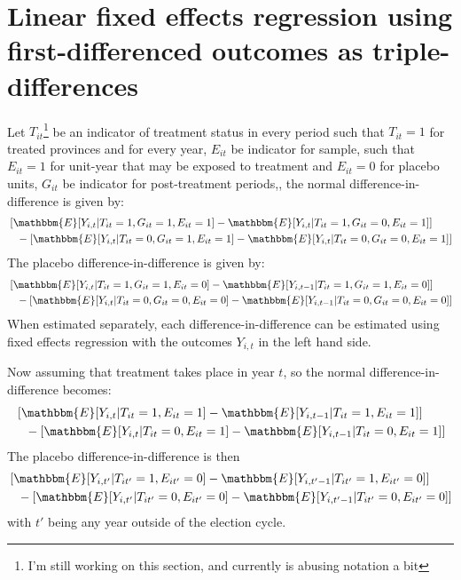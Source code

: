 \documentclass[12pt]{article}\usepackage[]{graphicx}\usepackage[]{color}
\newcommand{\1}{\mathbbm{1}}
\renewcommand\r{\right}
\renewcommand\l{\left}
\newcommand\E{\mathbbm{E}}
\begin{document}
\section{Linear fixed effects regression using first-differenced outcomes as triple-differences}
\label{app:proof1}

Let $T_{it}$\footnote{I'm still working on this section, and currently is abusing notation a bit} be an indicator of treatment status in every period such that $T_{it} = 1$ for treated provinces and for every year, $E_{it}$ be indicator for sample, such that $E_{it} = 1 $ for unit-year that may be exposed to treatment and $E_{it} = 0$ for placebo units, $G_{it}$ be indicator for post-treatment periods,, the normal difference-in-difference is given by:
	\begin{align*}
		& \l[\E[Y_{i,t} | T_{it}=1, G_{it}=1, E_{it}=1] - \E[Y_{i,t} | T_{it}=1, G_{it}=0, E_{it}=1]\r] \\
		&\phantom{=} - \l[\E[Y_{i,t} | T_{it}=0, G_{it}=1, E_{it}=1] - \E[Y_{i,t} | T_{it}=0, G_{it}=0, E_{it}=1]\r]
	\end{align*}
The placebo difference-in-difference is given by:
	\begin{align*}
		&\l[\E[Y_{i,t} | T_{it}=1, G_{it}=1, E_{it}=0] - \E[Y_{i,t-1} | T_{it}=1, G_{it}=1, E_{it}=0]\r] \\
		&\phantom{=} - \l[\E[Y_{i,t} | T_{it}=0, G_{it}=0, E_{it}=0] - \E[Y_{i,t-1} | T_{it}=0, G_{it}=0, E_{it}=0]\r]
	\end{align*}
When estimated separately, each difference-in-difference can be estimated using fixed effects regression with the outcomes $Y_{i,t}$ in the left hand side.

Now assuming that treatment takes place in year $t$, so the normal difference-in-difference becomes:
	\begin{align*}
		& \l[\E[Y_{i,t} | T_{it}=1, E_{it}=1] - \E[Y_{i,t-1} | T_{it}=1, E_{it}=1]\r] \\
		&\phantom{=} - \l[\E[Y_{i,t} | T_{it}=0, E_{it}=1] - \E[Y_{i,t-1} | T_{it}=0, E_{it}=1]\r]
	\end{align*}
The placebo difference-in-difference is then 
	\begin{align*}
		& \l[\E[Y_{i,t'} | T_{it'}=1, E_{it'}=0] - \E[Y_{i,t'-1} | T_{it'}=1, E_{it'}=0]\r] \\
		&\phantom{=} - \l[\E[Y_{i,t'} | T_{it'}=0, E_{it'}=0] - \E[Y_{i,t'-1} | T_{it'}=0, E_{it'}=0]\r]
	\end{align*}
with $t'$ being any year outside of the election cycle.
\end{document}
